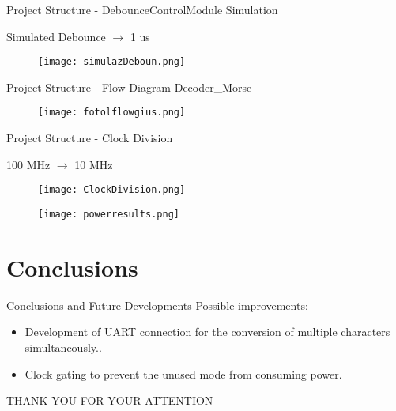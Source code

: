 \documentclass[9pt]{beamer}
\begin{document}
\begin{frame}{Project Structure -  DebounceControlModule Simulation}
    \begin{center}
        \Huge Simulated Debounce $\rightarrow$ 1 us
    \end{center}
    \begin{figure}
           \centering
           
           \texttt{[image: simulazDeboun.png]}
    \end{figure}
\end{frame}

\begin{frame}{Project Structure - Flow Diagram Decoder\_Morse }
    \begin{figure}
           \centering
           
           \texttt{[image: fotolflowgius.png]}
    \end{figure}
\end{frame}




\begin{frame}{Project Structure - Clock Division}
    \begin{center}
        \Huge 100 MHz $\rightarrow$ 10 MHz
    \end{center}
    \begin{figure}
           \centering
           
           \texttt{[image: ClockDivision.png]}
    \end{figure}
    \begin{figure}
           \centering
           
           \texttt{[image: powerresults.png]}
    \end{figure}
\end{frame}

\section{Conclusions}
\begin{frame}{Conclusions and Future Developments}
    Possible improvements:
    \begin{itemize}
        \item Development of UART connection for the conversion of multiple characters simultaneously..
        \item Clock gating to prevent the unused mode from consuming power.
    \end{itemize}
\end{frame}



\begin{frame}{}
   \centering
   \Huge THANK YOU FOR YOUR ATTENTION
\centering
\end{frame}
\end{document}
